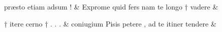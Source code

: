 \documentclass[12pt,onecolumn,twoside,a4paper]{memoir}
\begin{document}
               \begin{pairs}
                  \begin{Leftside}
			\beginnumbering
			\setcounter{stanzaL}{0}
                     
                         \stanza {}præsto
                              etiam
                              adsum
                              ! & Exprome
                              quid
                              fers
                              nam
                              te
                              longo
                              †
                              vadere & 
                     
                              †
                              itere
                              cerno
                              †
                              .
                              .
                              . \&
                         \stanza {}
                     coniugium
                              Pisis
                              petere
                              ,
                              ad
                              te
                              itiner
                              tendere \&
                         \stanza {}
                     

\end{Leftside}
\end{pairs}
\end{document}

